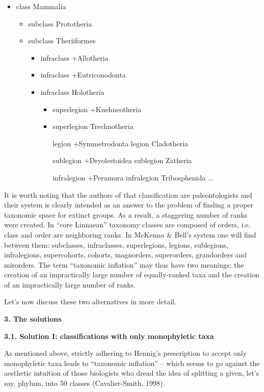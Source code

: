 \documentclass[a4paper]{article}
\begin{document}
\begin{itemize}
\item class Mammalia

\begin{itemize}
\item subclass Prototheria
\item subclass Theriiformes

\begin{itemize}
\item infraclass +Allotheria
\item infraclass +Eutriconodonta
\item infraclass Holotheria

\begin{itemize}
\item superlegion +Kuehneotheria
\item superlegion Trechnotheria

legion +Symmetrodonta
legion Cladotheria

sublegion +Dryolestoidea
sublegion Zatheria

infralegion +Peramura
infralegion Tribosphenida
...
\end{itemize}
\end{itemize}
\end{itemize}
\end{itemize}
It is worth noting that the authors of that classification are paleontologists and their system is clearly intended as
an answer to the problem of finding a proper taxonomic space for extinct groups. As a result, a staggering number of
ranks were created. In “core Linnaean” taxonomy classes are composed of orders, i.e. class and order are neighboring
ranks. In McKenna \& Bell’s system one will find between them: subclasses, infraclasses, superlegions, legions,
sublegions, infralegions, supercohorts, cohorts, magnorders, superorders, grandorders and mirorders. The term
“taxonomic inflation” may thus have two meanings: the creation of an impractically large number of equally-ranked taxa
and the creation of an impractically large number of ranks.

Let’s now discuss these two alternatives in more detail.

{\bfseries
3. The solutions}

{\bfseries
3.1. Solution I: classifications with only monophyletic taxa}

As mentioned above, strictly adhering to Hennig’s prescription to accept only monophyletic taxa leads to “taxonomic
inflation” – which seems to go against the aesthetic intuition of those biologists who dread the idea of splitting a
given, let’s say, phylum, into 50 classes \label{ref:RNDsx8NDQDrK2}(Cavalier-Smith, 1998).
\end{document}
